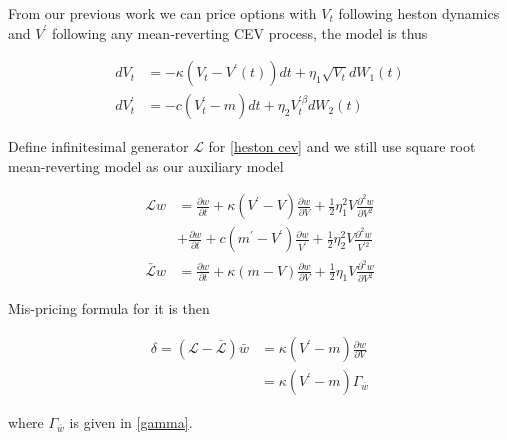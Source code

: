 From our previous work we can price options with $V_t$ following heston dynamics and $V^{\prime}$ following any mean-reverting CEV process, the model is thus

\begin{equation}\label{heston cev}
    \begin{aligned}
        d V_t &=-\kappa\left(V_t-V^{\prime}(t)\right) d t+\eta_{1} \sqrt{V_t} d W_1(t) \\
        d V^{\prime}_t &=-c\left(V^{\prime}_t-m\right) d t+\eta_{2} V^{\prime \beta}_t d W_{2}(t)
    \end{aligned}
\end{equation}

Define infinitesimal generator $\mathcal{L}$ for \eqref{heston cev} and we still use square root mean-reverting model as our auxiliary model

\begin{equation}\label{inf gen2}
    \begin{aligned}
        \mathcal{L} w&= \frac{\partial w}{\partial t}+\kappa(V^{\prime} - V) \frac{\partial w}{\partial V}+\frac{1}{2} \eta_1^{2} V \frac{\partial^{2} w}{\partial V^{2}} \\
        &+ \frac{\partial w}{\partial t}+c(m^{\prime} - V^{\prime}) \frac{\partial w}{V^{\prime}}+\frac{1}{2} \eta_2^{2} V \frac{\partial^{2} w}{V^{\prime 2}}\\
        \bar{\mathcal{L}} w &= \frac{\partial w}{\partial t}+\kappa(m - V) \frac{\partial w}{\partial V}+\frac{1}{2} \eta_1 V \frac{\partial^{2} w}{\partial V^{2}}
    \end{aligned}
\end{equation}

\noindent Mis-pricing formula for it is then

$$
\begin{aligned}
    \delta = (\mathcal{L} - \bar{\mathcal{L}}) \bar{w} &= \kappa(V^{\prime}-m)\frac{\partial w}{\partial V} \\
    &= \kappa(V^{\prime}-m) \Gamma_{\bar{w}}
\end{aligned}
$$

\noindent where $\Gamma_{\bar{w}}$ is given in \eqref{gamma}.